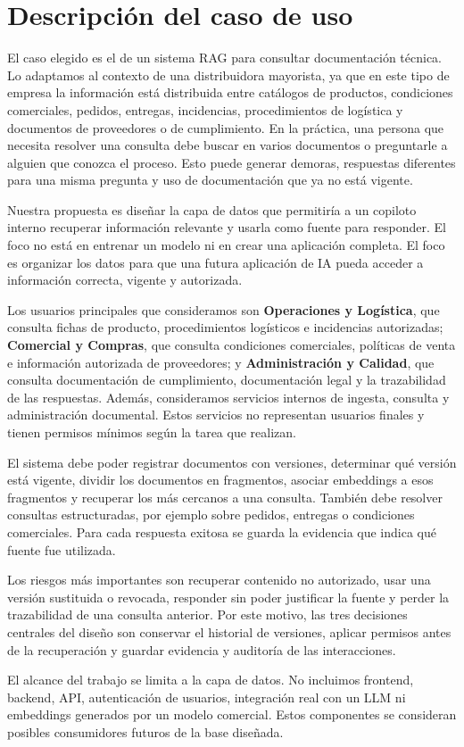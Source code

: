 \section{Descripción del caso de uso}

El caso elegido es el de un sistema RAG para consultar documentación técnica. Lo adaptamos al contexto de una distribuidora mayorista, ya que en este tipo de empresa la información está distribuida entre catálogos de productos, condiciones comerciales, pedidos, entregas, incidencias, procedimientos de logística y documentos de proveedores o de cumplimiento. En la práctica, una persona que necesita resolver una consulta debe buscar en varios documentos o preguntarle a alguien que conozca el proceso. Esto puede generar demoras, respuestas diferentes para una misma pregunta y uso de documentación que ya no está vigente.

Nuestra propuesta es diseñar la capa de datos que permitiría a un copiloto interno recuperar información relevante y usarla como fuente para responder. El foco no está en entrenar un modelo ni en crear una aplicación completa. El foco es organizar los datos para que una futura aplicación de IA pueda acceder a información correcta, vigente y autorizada.

Los usuarios principales que consideramos son \textbf{Operaciones y Logística}, que consulta fichas de producto, procedimientos logísticos e incidencias autorizadas; \textbf{Comercial y Compras}, que consulta condiciones comerciales, políticas de venta e información autorizada de proveedores; y \textbf{Administración y Calidad}, que consulta documentación de cumplimiento, documentación legal y la trazabilidad de las respuestas. Además, consideramos servicios internos de ingesta, consulta y administración documental. Estos servicios no representan usuarios finales y tienen permisos mínimos según la tarea que realizan.

El sistema debe poder registrar documentos con versiones, determinar qué versión está vigente, dividir los documentos en fragmentos, asociar embeddings a esos fragmentos y recuperar los más cercanos a una consulta. También debe resolver consultas estructuradas, por ejemplo sobre pedidos, entregas o condiciones comerciales. Para cada respuesta exitosa se guarda la evidencia que indica qué fuente fue utilizada.

Los riesgos más importantes son recuperar contenido no autorizado, usar una versión sustituida o revocada, responder sin poder justificar la fuente y perder la trazabilidad de una consulta anterior. Por este motivo, las tres decisiones centrales del diseño son conservar el historial de versiones, aplicar permisos antes de la recuperación y guardar evidencia y auditoría de las interacciones.

El alcance del trabajo se limita a la capa de datos. No incluimos frontend, backend, API, autenticación de usuarios, integración real con un LLM ni embeddings generados por un modelo comercial. Estos componentes se consideran posibles consumidores futuros de la base diseñada.

